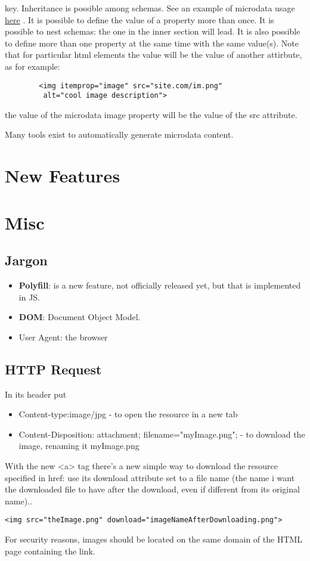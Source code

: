 \documentclass[a4paper,11pt]{book}
\begin{document}
    key. Inheritance is possible among schemas. See an example of microdata usage
    \href{http://pdata.altervista.org/HTML5/microdata/microdata.html}{here} . It is possible to define the value of a property
    more than once. It is possible to nest schemas: the one in the inner section will lead. It is also possible to
    define more than one property at the same time with the same value(s). Note that for particular html elements
    the value will be the value of another attirbute, as for example:
    \begin{verbatim}
        <img itemprop="image" src="site.com/im.png"
         alt="cool image description">
    \end{verbatim}
    the value of the microdata image property will be the value of the src attribute.
    
    Many tools exist to automatically generate microdata content.

\chapter{New Features}

\chapter{Misc}
    \section{Jargon}
    \begin{itemize}
        \item \textbf{Polyfill}: is a new feature, not officially released yet, but that is implemented in JS.
        \item \textbf{DOM}: Document Object Model.
        \item User Agent: the browser
    \end{itemize}
    \section{HTTP Request}
    In its header put
    \begin{itemize}
        \item Content-type:image/jpg - to open the resource in a new tab
        \item Content-Disposition: attachment; filename="myImage.png"; - to download the image, renaming it myImage.png
    \end{itemize}
    With the new <a> tag there's a new simple way to download the resource specified in href: use its download attribute
    set to a file name (the name i want the downloaded file to have after the download, even if different from its original name)..
    \begin{verbatim}<img src="theImage.png" download="imageNameAfterDownloading.png">\end{verbatim}
    For security reasons, images should be located on the same domain of the HTML page containing the link.
\end{document}
